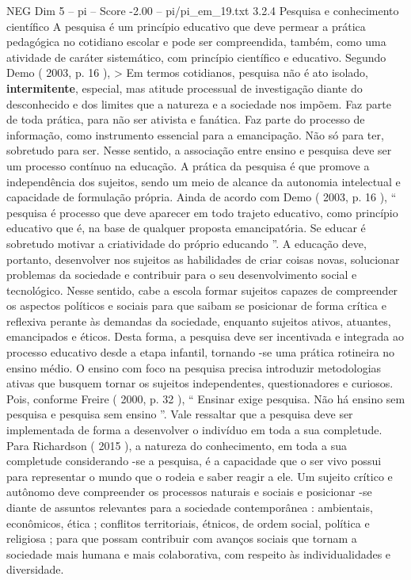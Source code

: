 \begin{textsample}{NEG Dim 5 – pi – Score -2.00 – pi/pi\_em\_19.txt}  \label{ex:f5_neg_051}
3.2.4 Pesquisa e conhecimento científico A pesquisa é um princípio educativo que deve permear a prática pedagógica no cotidiano escolar e pode ser compreendida, também, como uma atividade de caráter sistemático, com princípio científico e educativo.
Segundo Demo ( 2003, p. 16 ), > Em termos cotidianos, pesquisa não é ato isolado, \textbf{intermitente}, especial, mas atitude processual de investigação diante do desconhecido e dos limites que a natureza e a sociedade nos impõem.
Faz parte de toda prática, para não ser ativista e fanática.
Faz parte do processo de informação, como instrumento essencial para a emancipação.
Não só para ter, sobretudo para ser.
Nesse sentido, a associação entre ensino e pesquisa deve ser um processo contínuo na educação.
A prática da pesquisa é que promove a independência dos sujeitos, sendo um meio de alcance da autonomia intelectual e capacidade de formulação própria.
Ainda de acordo com Demo ( 2003, p. 16 ), “ pesquisa é processo que deve aparecer em todo trajeto educativo, como princípio educativo que é, na base de qualquer proposta emancipatória.
Se educar é sobretudo motivar a criatividade do próprio educando ”.
A educação deve, portanto, desenvolver nos sujeitos as habilidades de criar coisas novas, solucionar problemas da sociedade e contribuir para o seu desenvolvimento social e tecnológico.
Nesse sentido, cabe a escola formar sujeitos capazes de compreender os aspectos políticos e sociais para que saibam se posicionar de forma crítica e reflexiva perante às demandas da sociedade, enquanto sujeitos ativos, atuantes, emancipados e éticos.
Desta forma, a pesquisa deve ser incentivada e integrada ao processo educativo desde a etapa infantil, tornando -se uma prática rotineira no ensino médio.
O ensino com foco na pesquisa precisa introduzir metodologias ativas que busquem tornar os sujeitos independentes, questionadores e curiosos.
Pois, conforme Freire ( 2000, p. 32 ), “ Ensinar exige pesquisa.
Não há ensino sem pesquisa e pesquisa sem ensino ”.
Vale ressaltar que a pesquisa deve ser implementada de forma a desenvolver o indivíduo em toda a sua completude.
Para Richardson ( 2015 ), a natureza do conhecimento, em toda a sua completude considerando -se a pesquisa, é a capacidade que o ser vivo possui para representar o mundo que o rodeia e saber reagir a ele.
Um sujeito crítico e autônomo deve compreender os processos naturais e sociais e posicionar -se diante de assuntos relevantes para a sociedade contemporânea : ambientais, econômicos, ética ; conflitos territoriais, étnicos, de ordem social, política e religiosa ; para que possam contribuir com avanços sociais que tornam a sociedade mais humana e mais colaborativa, com respeito às individualidades e diversidade.

\end{textsample}
